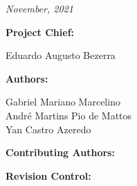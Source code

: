 %
%
%
%
%

%
%
%
%
%
%

\thispagestyle{empty}

\begin{center}

\textbf{\thetitle}

\textit{November, 2021}

\vspace{1cm}

\textbf{Project Chief:}

Eduardo Augusto Bezerra

\vspace{1cm}

\textbf{Authors:}

Gabriel Mariano Marcelino \\
André Martins Pio de Mattos \\
Yan Castro Azeredo \\

\vspace{1cm}

\textbf{Contributing Authors:}


\vspace{1cm}


\textbf{Revision Control:}

\end{center}

